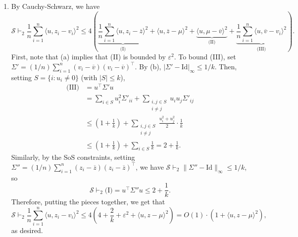 \documentclass[11pt]{article}
\theoremstyle{definition}
\renewcommand{\epsilon}{\varepsilon}
\newcommand{\Id}{\mathrm{Id}}
\begin{document}
\begin{enumerate}[label=(\alph*)]
  \item By Cauchy-Schwarz, we have
  \[ \mathcal{S} \vdash_2 \frac{1}{n} \sum_{i=1}^n \langle u, z_i - v_i\rangle^2 \le 4 \left(\underbrace{\frac{1}{n} \sum_{i=1}^n  \langle u, z_i - \overline{z}\rangle^2}_{\text{(I)}} +  \langle u, \overline{z} - \mu\rangle^2 + \underbrace{\langle u, \mu - \overline{v}\rangle^2}_{\text{(II)}} + \underbrace{\frac{1}{n} \sum_{i=1}^n \langle u, \overline{v} - v_i\rangle^2}_{\text{(III)}}\right). \]
  First, note that (a) implies that (II) is bounded by $\epsilon^2$. To bound (III), set $\Sigma' = (1/n) \sum_{i=1}^n (v_i - \overline{v})(v_i - \overline{v})^\top$. By (b), $|\Sigma' - \Id|_\infty \le 1/k$. Then, setting $S = \{i : u_i \ne 0\}$ (with $|S| \le k$),
  \begin{align*}
    \text{(III)} &= u^\top \Sigma' u \\
      &= \sum_{i \in S} u_i^2 \Sigma'_{ii} + \sum_{\substack{i,j \in S \\ i \ne j}} u_i u_j \Sigma'_{ij} \\
      &\le \left(1 + \frac{1}{k}\right) + \sum_{\substack{i,j \in S \\ i \ne j}} \frac{u_i^2 + u_j^2}{2} \cdot \frac{1}{k} \\
      &\le \left(1 + \frac{1}{k}\right) + \sum_{i \in S} \frac{1}{k} = 2 + \frac{1}{k}.
  \end{align*}
  Similarly, by the SoS constraints, setting $\Sigma'' = (1/n) \sum_{i=1}^n (z_i - \overline{z})(z_i - \overline{z})^\top$, we have $\mathcal{S} \vdash_2 \|\Sigma'' - \Id\|_\infty \le 1/k$, so
  \[ \mathcal{S} \vdash_2 \text{(I)} = u^\top \Sigma'' u \le 2 + \frac{1}{k}. \]
  Therefore, putting the pieces together, we get that
  \[ \mathcal{S} \vdash_2 \frac{1}{n} \sum_{i=1}^n  \langle u, z_i - v_i\rangle^2 \le 4\left(4 + \frac{2}{k} + \epsilon^2 +  \langle u, z-\mu\rangle^2\right) = O(1) \cdot (1 +  \langle u,z-\mu\rangle^2), \]
  as desired.
  

\end{enumerate}
\end{document}
